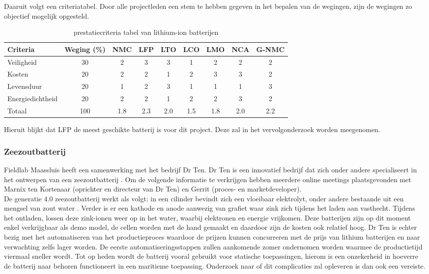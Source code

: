 \noindent Daaruit volgt een criteriatabel. Door alle projectleden een stem te hebben gegeven in het bepalen van de wegingen, zijn de wegingen zo objectief mogelijk opgesteld. 


\begin{table}[h]
\centering
\caption{prestatiecriteria tabel  van lithium-ion batterijen \cite{Szewczyk2023}}
\begin{tabular}{lcccccccc}
\toprule
Criteria & Weging (\%) & NMC & LFP & LTO & LCO & LMO & NCA & G-NMC \\
\midrule
Veiligheid          & 30 & 2 & 3 & 3 & 1 & 2 & 2 & 2\\ 
Kosten              & 20 & 2 & 2 & 1 & 2 & 3 & 3 & 2\\ 
Levensduur          & 20 & 1 & 2 & 3 & 1 & 1 & 1 & 3\\
Energiedichtheid    & 20 & 2 & 2 & 1 & 2 & 2 & 3 & 2\\
Totaal              & 100 & 1.8 & 2.3 & 2.0 & 1.5 & 1.8 & 2.0 & 2.2\\
\bottomrule
\end{tabular}
\label{tab:vergelijking_batterijen}
\end{table}

\noindent Hieruit blijkt dat LFP de meest geschikte batterij is voor dit project. Deze zal in het vervolgonderzoek worden meegenomen.

\subsubsection{\textbf{Zeezoutbatterij}}

Fieldlab Maassluis heeft een samenwerking met het bedrijf Dr Ten. Dr Ten is een innovatief bedrijf dat zich onder andere specialiseert in het ontwerpen van een zeezoutbatterij \cite{drten_zeezout_batterij2}. Om de volgende informatie te verkrijgen hebben meerdere online meetings plaatsgevonden met Marnix ten Kortenaar (oprichter en directeur van Dr Ten) en Gerrit (proces- en marketdeveloper). \\

\noindent De generatie 4.0 zeezoutbatterij werkt als volgt: in een cilinder bevindt zich een vloeibaar elektrolyt, onder andere bestaande uit een mengsel van zout water \cite{kouwenberg2023}. Verder is er een kathode en anode aanwezig van grafiet waar zink zich tijdens het laden aan vasthecht. Tijdens het ontladen, lossen deze zink-ionen weer op in het water, waarbij elektronen en energie vrijkomen. Deze batterijen zijn op dit moment enkel verkrijgbaar als demo model, de cellen worden met de hand gemaakt en daardoor zijn de kosten ook relatief hoog. Dr Ten is echter bezig met het automatiseren van het productieproces waardoor de prijzen kunnen concurreren met de prijs van lithium batterijen en naar verwachting zelfs lager worden. De eerste automatiseringsstappen zullen aankomende zomer ondernomen worden waarmee de productietijd viermaal sneller wordt. Tot op heden wordt de batterij vooral gebruikt voor statische toepassingen, hierom is een onzekerheid in hoeverre de batterij naar behoren functioneert in een maritieme toepassing. Onderzoek naar of dit complicaties zal opleveren is dan ook een vereiste.

